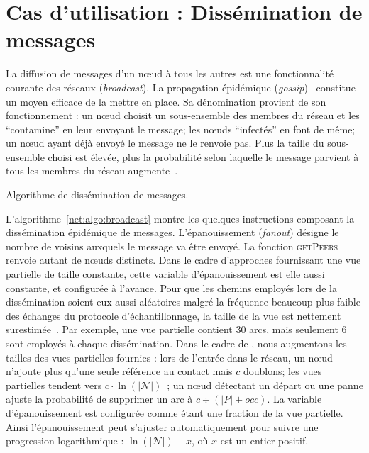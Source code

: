 
\section{Cas d'utilisation : Dissémination de messages}
\label{net:sec:usecase}

La diffusion de messages d'un nœud à tous les autres est une fonctionnalité
courante des réseaux (\emph{broadcast}). La propagation épidémique
(\emph{gossip})~\cite{birman1999bimodal} constitue un moyen efficace de la
mettre en place. Sa dénomination provient de son fonctionnement : un nœud
choisit un sous-ensemble des membres du réseau et les ``contamine'' en leur
envoyant le message; les nœuds ``infectés'' en font de même; un nœud ayant déjà
envoyé le message ne le renvoie pas. Plus la taille du sous-ensemble choisi est
élevée, plus la probabilité selon laquelle le message parvient à tous les
membres du réseau augmente~\cite{erdos1959random}.

\begin{algorithm}
  
  \caption[Algorithme de dissémination de
  messages]{\label{net:algo:broadcast}Algorithme de dissémination de messages.}
\end{algorithm}


L'algorithme~\ref{net:algo:broadcast} montre les quelques instructions composant
la dissémination épidémique de messages. L'épanouissement (\emph{fanout})
désigne le nombre de voisins auxquels le message va être envoyé. La fonction
\textsc{getPeers} renvoie autant de nœuds distincts. Dans le cadre d'approches
fournissant une vue partielle de taille constante, cette variable
d'épanouissement est elle aussi constante, et configurée à l'avance. Pour que
les chemins employés lors de la dissémination soient eux aussi aléatoires malgré
la fréquence beaucoup plus faible des échanges du protocole d'échantillonnage,
la taille de la vue est nettement surestimée~\cite{frey2009heterogeneous}. Par
exemple, une vue partielle contient 30 arcs, mais seulement 6 sont employés à
chaque dissémination. Dans le cadre de \SPRAY, nous augmentons les tailles des
vues partielles fournies : lors de l'entrée dans le réseau, un nœud n'ajoute
plus qu'une seule référence au contact mais $c$ doublons; les vues partielles
tendent vers $c\cdot\ln(|\mathcal{N}|)$~\cite{ganesh2003peer}; un nœud détectant
un départ ou une panne ajuste la probabilité de supprimer un arc à
$c \div (|P|+occ)$. La variable d'épanouissement est configurée comme étant une
fraction de la vue partielle. Ainsi l'épanouissement peut s'ajuster
automatiquement pour suivre une progression logarithmique :
$\ln(|\mathcal{N}|)+x$, où $x$ est un entier positif.

